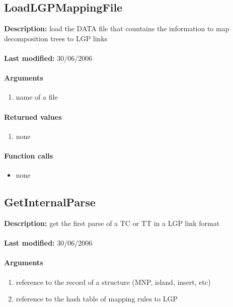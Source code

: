 \subsection{LoadLGPMappingFile}
\textbf{Description:} load the DATA file that countains the information to map decomposition trees to LGP links\\
\\\textbf{Last modified:} 30/06/2006

\paragraph{Arguments}
\begin{enumerate}
\item name of a file
\end{enumerate}

\paragraph{Returned values}
\begin{enumerate}
\item none
\end{enumerate}

\paragraph{Function calls}
\begin{itemize}
\item none
\end{itemize}

\subsection{GetInternalParse}
\textbf{Description:} get the first parse of a TC or TT in a LGP link format\\
\\\textbf{Last modified:} 30/06/2006

\paragraph{Arguments}
\begin{enumerate}
\item reference to the record of a structure (MNP, island, insert, etc)
\item reference to the hash table of mapping rules to LGP
\end{enumerate}

